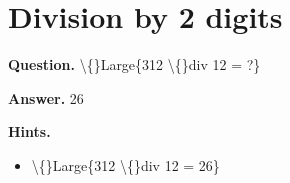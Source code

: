 \documentclass{article}
\begin{document}
\section*{Division by 2 digits}
\textbf{Question.} \textbackslash\{\}Large\{312 \textbackslash\{\}div 12 = ?\}

\textbf{Answer.} 26

\textbf{Hints.}
\begin{itemize}
  \item \textbackslash\{\}Large\{312 \textbackslash\{\}div 12 = 26\}
\end{itemize}
\end{document}
